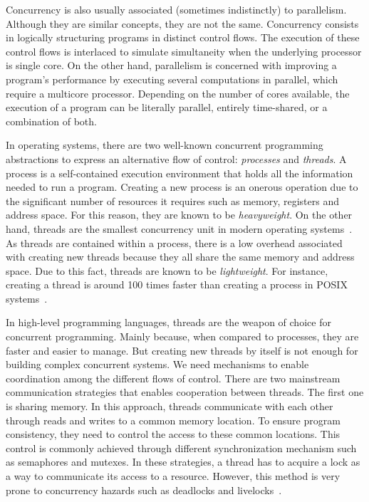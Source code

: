 Concurrency is also usually associated (sometimes indistinctly) to parallelism. Although they are similar concepts, they are not the same. Concurrency consists in logically structuring programs in distinct control flows. The execution of these control flows is interlaced to simulate simultaneity when the underlying processor is single core. On the other hand, parallelism is concerned with improving a program's performance by executing several computations in parallel, which require a multicore processor. Depending on the number of cores available, the execution of a program can be literally parallel, entirely time-shared, or a combination of both.

In operating systems, there are two well-known concurrent programming abstractions to express an alternative flow of control: \emph{processes} and \emph{threads}. A process is a self-contained execution environment that holds all the information needed to run a program. Creating a new process is an onerous operation due to the significant number of resources it requires such as memory, registers and address space. For this reason, they are known to be \emph{heavyweight}. On the other hand, threads are the smallest concurrency unit in modern operating systems~\cite{tanenbaum:2007}. As threads are contained within a process, there is a low overhead associated with creating new threads because they all share the same memory and address space. Due to this fact, threads are known to be \emph{lightweight}. For instance, creating a thread is around 100 times faster than creating a process in POSIX systems~\cite{butenhof:1997}.

In high-level programming languages, threads are the weapon of choice for concurrent programming. Mainly because, when compared to processes, they are faster and easier to manage. But creating new threads by itself is not enough for building complex concurrent systems. We need mechanisms to enable coordination among the different flows of control. There are two mainstream communication strategies that enables cooperation between threads. The first one is sharing memory. In this approach, threads communicate with each other through reads and writes to a common memory location. To ensure program consistency, they need to control the access to these common locations. This control is commonly achieved through different synchronization mechanism such as semaphores and mutexes. In these strategies, a thread has to acquire a lock as a way to communicate its access to a resource. However, this method is very prone to concurrency hazards such as deadlocks and livelocks~\cite{herlihy:2012}.

